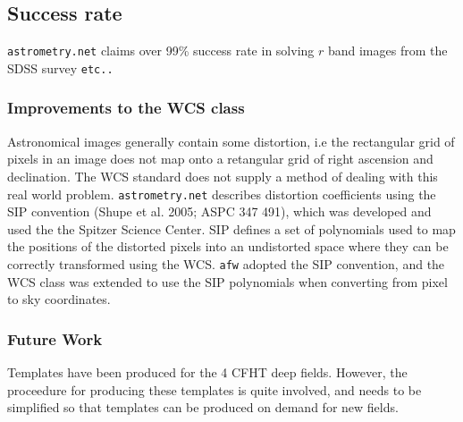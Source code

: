 \subsection{Success rate}
{\tt astrometry.net} claims over 99\% success rate in solving $r$ band images from the SDSS survey {\tt etc..}

\subsubsection{Improvements to the WCS class}
Astronomical images generally contain some distortion, i.e the rectangular grid of pixels in an image does not map onto a retangular grid of right ascension and declination. The WCS standard does not supply a method of dealing with this real world problem. {\tt astrometry.net} describes distortion coefficients using the SIP convention (Shupe et al. 2005; ASPC 347 491), which was developed and used the the Spitzer Science Center. SIP defines a set of polynomials used to map the positions of the distorted pixels into an undistorted space where they can be correctly transformed using the WCS. {\tt afw} adopted the SIP convention, and the WCS class was extended to use the SIP polynomials when converting from pixel to sky coordinates.


\subsubsection{Future Work}
Templates have been produced for the 4 CFHT deep fields. However, the proceedure for producing these templates is quite involved, and needs to be simplified so that templates can be produced on demand for new fields.
